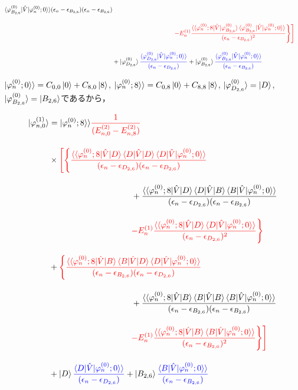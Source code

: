 \begin{align}
{{    \braket{\varphi^{(0)}_{B_{2,6}}|\hat{V}|\varphi^{(0)}_n;0}\rangle}
    {(\epsilon_n-\epsilon_{B_{2,6}})(\epsilon_n-\epsilon_{B_{2,6}})}}\nn[10pt]
    &\hspace{100pt}
    \textcolor{red}{-E^{(1)}_n
    \frac{\langle\braket{\varphi^{(0)}_{n};8|\hat{V}|\varphi^{(0)}_{B_{2,6}}}
    \braket{\varphi^{(0)}_{B_{2,6}}|\hat{V}|\varphi^{(0)}_n;0}\rangle}{(\epsilon_n-\epsilon_{B_{2,6}})^2}
    \Biggr\}\Biggr]}
    \nn[10pt]
    &+
    \ket{\varphi^{(0)}_{D_{2,6}}}
    \textcolor{blue}{
    \frac{\braket{\varphi^{(0)}_{D_{2,6}}|\hat{V}|\varphi^{(0)}_n;0}\rangle}{(\epsilon_n-\epsilon_{D_{2,6}})}}
    +
    \ket{\varphi^{(0)}_{B_{2,6}}}
    \textcolor{blue}{
    \frac{\braket{\varphi^{(0)}_{B_{2,6}}|\hat{V}|\varphi^{(0)}_n;0}\rangle}{(\epsilon_n-\epsilon_{B_{2,6}})}}
\end{align}

$|\varphi^{(0)}_{n};0\rangle\rangle=C_{0,0}\ket{0}+C_{8,0}\ket{8}$, 
$|\varphi^{(0)}_{n};8\rangle\rangle=C_{0,8}\ket{0}+C_{8,8}\ket{8}$,  $|\varphi^{(0)}_{D_{2,6}}\rangle=\ket{D}$, $|\varphi^{(0)}_{B_{2,6}}\rangle=\ket{B_{2,6}}$であるから，


\begin{align}
    \ket{\varphi_{n,0}^{(1)}}
    &=
    |\varphi^{(0)}_n;8\rangle\rangle
    \textcolor{red}{\frac{1}{(E^{(2)}_{n,0}-E^{(2)}_{n,8})}}\nn[10pt]
    &\times
    \textcolor{red}{\Biggl[\Biggl\{
    \frac{\langle\braket{\varphi^{(0)}_{n};8|\hat{V}|D}
    \langle{D|\hat{V}|D}\rangle
    \braket{D|\hat{V}|\varphi^{(0)}_n;0}\rangle}
    {(\epsilon_n-\epsilon_{D_{2,6}})(\epsilon_n-\epsilon_{D_{2,6}})}}\nn[10pt]
    &\hspace{100pt}
    +{\frac{\langle\braket{\varphi^{(0)}_{n};8|\hat{V}|D}
    \langle{D|\hat{V}|B}\rangle
    \braket{B|\hat{V}|\varphi^{(0)}_n;0}\rangle}
    {(\epsilon_n-\epsilon_{D_{2,6}})(\epsilon_n-\epsilon_{B_{2,6}})}}\nn[10pt]
    &\hspace{100pt}
    \textcolor{red}{-E^{(1)}_n
    \frac{\langle\braket{\varphi^{(0)}_{n};8|\hat{V}|D}
    \braket{D|\hat{V}|\varphi^{(0)}_n;0}\rangle}{(\epsilon_n-\epsilon_{D_{2,6}})^2}
    \Biggr\}}
    \nn[10pt]
    &+\textcolor{red}{\Biggl\{
    \frac{\langle\braket{\varphi^{(0)}_{n};8|\hat{V}|B}
    \langle{B|\hat{V}|D}\rangle
    \braket{D|\hat{V}|\varphi^{(0)}_n;0}\rangle}
    {(\epsilon_n-\epsilon_{B_{2,6}})(\epsilon_n-\epsilon_{D_{2,6}})}}\nn[10pt]
    &\hspace{100pt}
    +{\frac{\langle\braket{\varphi^{(0)}_{n};8|\hat{V}|B}
    \langle{B|\hat{V}|B}\rangle
    \braket{B|\hat{V}|\varphi^{(0)}_n;0}\rangle}
    {(\epsilon_n-\epsilon_{B_{2,6}})(\epsilon_n-\epsilon_{B_{2,6}})}}\nn[10pt]
    &\hspace{100pt}
    \textcolor{red}{-E^{(1)}_n
    \frac{\langle\braket{\varphi^{(0)}_{n};8|\hat{V}|B}
    \braket{B|\hat{V}|\varphi^{(0)}_n;0}\rangle}{(\epsilon_n-\epsilon_{B_{2,6}})^2}
    \Biggr\}\Biggr]}
    \nn[10pt]
    &+
    \ket{D}
    \textcolor{blue}{
    \frac{\braket{D|\hat{V}|\varphi^{(0)}_n;0}\rangle}{(\epsilon_n-\epsilon_{D_{2,6}})}}
    +
    \ket{B_{2,6}}
    \textcolor{blue}{
    \frac{\braket{B|\hat{V}|\varphi^{(0)}_n;0}\rangle}{(\epsilon_n-\epsilon_{B_{2,6}})}}
\end{align}

